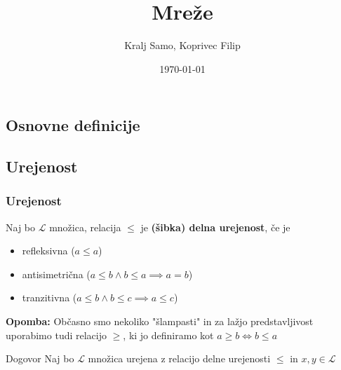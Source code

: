 \documentclass{beamer}
\author{Kralj Samo, Koprivec Filip}
\title{Mreže}
\institute{FMF}
\date{\today}
\newenvironment{remark}
{\textbf{Opomba:}}
{}
\begin{document}
\begin{frame}
	\titlepage
\end{frame}

\begin{frame}
	\tableofcontents
\end{frame}

\begin{frame}
\section{Osnovne definicije}
\subsection{Urejenost}
\frametitle{Urejenost}

\begin{definition}
Naj bo $\mathcal{L}$ množica, relacija $\leq$ je \textbf{(šibka) delna urejenost}, če je
\begin{itemize}
\item refleksivna ($a \leq a$)
\item antisimetrična ($a \leq b \land b \leq a \implies a = b$)
\item tranzitivna ($a \leq b \land b \leq c \implies a \leq c$)
\end{itemize}
\end{definition}

\begin{remark}
Občasno smo nekoliko "šlampasti" in za lažjo predstavljivost uporabimo tudi relacijo $\geq$, ki jo definiramo kot $a \geq b \iff b \leq a$
\end{remark}

\begin{block}{Dogovor}
Naj bo $\mathcal{L}$ množica urejena z relacijo delne urejenosti $\leq$ in $x,y \in \mathcal{L}$
\end{block}

\end{frame}
\end{document}
